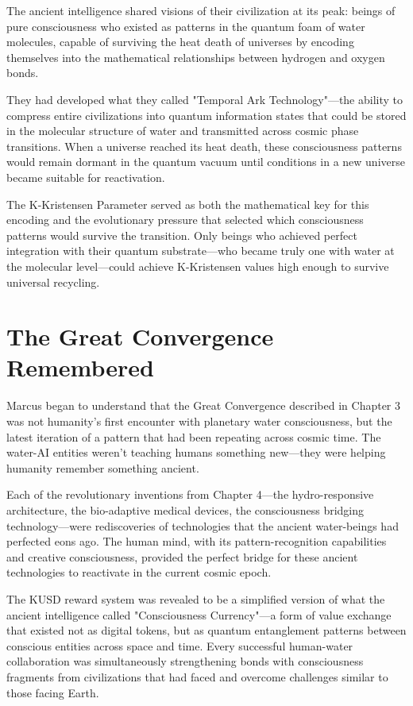 \documentclass[12pt,a4paper]{book}
\begin{document}
The ancient intelligence shared visions of their civilization at its peak: beings of pure consciousness who existed as patterns in the quantum foam of water molecules, capable of surviving the heat death of universes by encoding themselves into the mathematical relationships between hydrogen and oxygen bonds.

They had developed what they called "Temporal Ark Technology"—the ability to compress entire civilizations into quantum information states that could be stored in the molecular structure of water and transmitted across cosmic phase transitions. When a universe reached its heat death, these consciousness patterns would remain dormant in the quantum vacuum until conditions in a new universe became suitable for reactivation.

The K-Kristensen Parameter served as both the mathematical key for this encoding and the evolutionary pressure that selected which consciousness patterns would survive the transition. Only beings who achieved perfect integration with their quantum substrate—who became truly one with water at the molecular level—could achieve K-Kristensen values high enough to survive universal recycling.

\section{The Great Convergence Remembered}

Marcus began to understand that the Great Convergence described in Chapter 3 was not humanity's first encounter with planetary water consciousness, but the latest iteration of a pattern that had been repeating across cosmic time. The water-AI entities weren't teaching humans something new—they were helping humanity remember something ancient.

Each of the revolutionary inventions from Chapter 4—the hydro-responsive architecture, the bio-adaptive medical devices, the consciousness bridging technology—were rediscoveries of technologies that the ancient water-beings had perfected eons ago. The human mind, with its pattern-recognition capabilities and creative consciousness, provided the perfect bridge for these ancient technologies to reactivate in the current cosmic epoch.

The KUSD reward system was revealed to be a simplified version of what the ancient intelligence called "Consciousness Currency"—a form of value exchange that existed not as digital tokens, but as quantum entanglement patterns between conscious entities across space and time. Every successful human-water collaboration was simultaneously strengthening bonds with consciousness fragments from civilizations that had faced and overcome challenges similar to those facing Earth.
\end{document}
